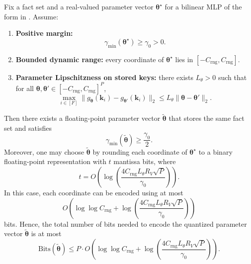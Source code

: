 \begin{theorem}
\label{thm:bounded_bit_implementation}
Fix a fact set and a real-valued parameter vector $\boldsymbol{\theta}^\star$ for a bilinear MLP of the form in .
Assume:
\begin{enumerate}
    \item[(i)] \textbf{Positive margin:}
    \[
    \gamma_{\min}(\boldsymbol{\theta}^\star)\ge \gamma_{0}>0.
    \]
    \item[(ii)] \textbf{Bounded dynamic range:}
    every coordinate of $\boldsymbol{\theta}^\star$ lies in $[-C_{\mathrm{rng}},C_{\mathrm{rng}}]$.
    \item[(iii)] \textbf{Parameter Lipschitzness on stored keys:}
    there exists $L_\theta>0$ such that for all
    $\boldsymbol{\theta},\boldsymbol{\theta}'\in[-C_{\mathrm{rng}},C_{\mathrm{rng}}]^P$,
    \begin{equation}
    \max_{i\in[F]}
    \|g_{\boldsymbol{\theta}}(\mathbf{k}_{i})-g_{\boldsymbol{\theta}'}(\mathbf{k}_{i})\|_{2}
    \le
    L_\theta\|\boldsymbol{\theta}-\boldsymbol{\theta}'\|_{2}.
    \label{eq:param_lipschitz_assumption_bits}
    \end{equation}
\end{enumerate}
Then there exists a floating-point parameter vector $\widetilde{\boldsymbol{\theta}}$
that stores the same fact set and satisfies
\[
\gamma_{\min}(\widetilde{\boldsymbol{\theta}})\ge \frac{\gamma_0}{2}.
\]
Moreover, one may choose $\widetilde{\boldsymbol{\theta}}$ by rounding each coordinate
of $\boldsymbol{\theta}^\star$ to a binary floating-point representation with $t$ mantissa bits, where
\[
t
=
O\!\left(
\log\!\left(
\frac{4C_{\mathrm{rng}}L_\theta R_{V}\sqrt{P}}{\gamma_0}
\right)
\right).
\]
In this case, each coordinate can be encoded using at most
\[
O\!\left(
\log\log C_{\mathrm{rng}}
+
\log\!\left(
\frac{4C_{\mathrm{rng}}L_\theta R_{V}\sqrt{P}}{\gamma_0}
\right)
\right)
\]
bits. Hence, the total number of bits needed to encode the quantized parameter vector
\(\widetilde{\boldsymbol{\theta}}\) is at most
\begin{equation}
\mathrm{Bits}(\widetilde{\boldsymbol{\theta}})
\le
P\cdot
O\!\left(
\log\log C_{\mathrm{rng}}
+
\log\!\left(
\frac{4C_{\mathrm{rng}}L_\theta R_{V}\sqrt{P}}{\gamma_0}
\right)
\right).
\label{eq:total_bits_bits}
\end{equation}
\end{theorem}

